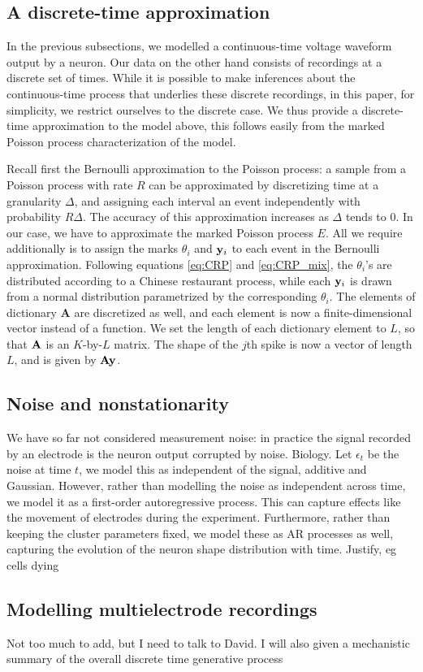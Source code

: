 \subsection{A discrete-time approximation}
In the previous subsections, we modelled a continuous-time voltage waveform output by a neuron. Our data on the other hand consists of recordings
at a discrete set of times. While it is possible to make inferences about the continuous-time process that underlies these discrete recordings,
in this paper, for simplicity, we restrict ourselves to the discrete case. We thus provide a discrete-time approximation to the model above, 
this follows easily from the marked Poisson process characterization of the model.

Recall first the Bernoulli approximation to the Poisson process: a sample from a Poisson process with rate $R$ can be approximated by discretizing
time at a granularity $\Delta$, and assigning each interval an event independently with probability $R\Delta$. The accuracy of this approximation increases 
as $\Delta$ tends to $0$.
%
In our case, we have to approximate the marked Poisson process $E$. All we require additionally is to assign the marks $\theta_i$ and $\mathbf{y}_i$ to each event 
in the Bernoulli approximation. Following equations \eqref{eq:CRP} and \eqref{eq:CRP_mix}, the $\theta_i$'s are distributed according
to a Chinese restaurant process, while each $\mathbf{y}_i$ is drawn from a normal distribution parametrized by the corresponding $\theta_i$. The elements
of dictionary $\mathbf{A}$ are discretized as well, and each element is now a finite-dimensional vector instead of a function. We set the length of each
dictionary element to $L$, so that $\mathbf{A}$ is an $K$-by-$L$ matrix. The shape of the $j$th spike is now a vector of length $L$, and is given by $\mathbf{A} \mathbf{y}$.

\subsection{Noise and nonstationarity}
We have so far not considered measurement noise: in practice the signal recorded by an electrode is the neuron output corrupted by noise. 
{\color{red} Biology}. Let $\epsilon_t$ be the noise at time $t$, we model this as independent of the signal, additive and Gaussian.
However, rather than modelling the noise as independent across time, we model it as a first-order autoregressive process. This can capture
effects like the movement of electrodes during the experiment. Furthermore, rather than keeping the cluster parameters fixed, we model these as
AR processes as well, capturing the evolution of the neuron shape distribution with time. {\color{red} Justify, eg cells dying}

\subsection{Modelling multielectrode recordings}
{\color{red} Not too much to add, but I need to talk to David. I will also given a mechanistic summary of the overall discrete time generative process}
